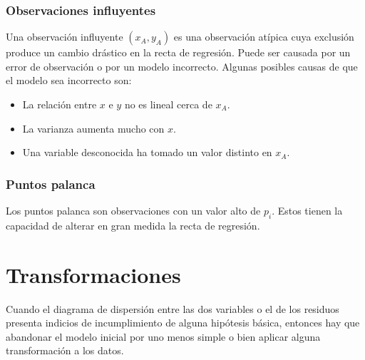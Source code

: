 \subsubsection{Observaciones influyentes}
\noindent Una observación influyente $(x_A, y_A)$ es una observación atípica cuya exclusión produce un cambio drástico en la recta de regresión. Puede ser causada por un error de observación o por un modelo incorrecto. Algunas posibles causas de que el modelo sea incorrecto son:
\begin{itemize}
    \item La relación entre $x$ e $y$ no es lineal cerca de $x_A$.
    \item La varianza aumenta mucho con $x$.
    \item Una variable desconocida ha tomado un valor distinto en $x_A$.
\end{itemize}

\subsubsection{Puntos palanca}
\noindent Los puntos palanca son observaciones con un valor alto de $p_i$.
Estos tienen la capacidad de alterar en gran medida la recta de regresión.

\section{Transformaciones}
\noindent Cuando el diagrama de dispersión entre las dos variables o el de los residuos presenta indicios de incumplimiento de alguna hipótesis básica, entonces hay que abandonar el modelo inicial por uno menos simple o bien aplicar alguna transformación a los datos.
